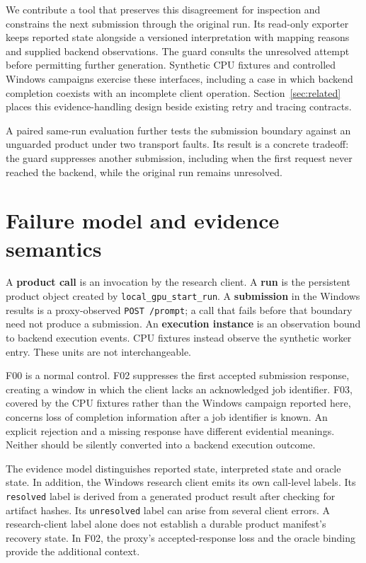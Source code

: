 \documentclass[conference,letterpaper,10pt]{IEEEtran}
\begin{document}
We contribute a tool that preserves this disagreement for inspection and
constrains the next submission through the original run. Its read-only exporter
keeps reported state alongside a versioned interpretation with mapping reasons
and supplied backend observations. The guard consults the unresolved attempt
before permitting further generation. Synthetic CPU fixtures and controlled
Windows campaigns exercise these interfaces, including a case in which backend
completion coexists with an incomplete client operation. Section~\ref{sec:related}
places this evidence-handling design beside existing retry and tracing contracts.

A paired same-run evaluation further tests the submission boundary against an
unguarded product under two transport faults. Its result is a concrete tradeoff:
the guard suppresses another submission, including when the first request never
reached the backend, while the original run remains unresolved.

\section{Failure model and evidence semantics}

A \textbf{product call} is an invocation by the research client. A \textbf{run} is the
persistent product object created by \texttt{local\_gpu\_start\_run}. A \textbf{submission} in
the Windows results is a proxy-observed \texttt{POST /prompt}; a call that fails before
that boundary need not produce a submission. An \textbf{execution instance} is an
observation bound to backend execution events. CPU fixtures instead observe
the synthetic worker entry. These units are not interchangeable.

F00 is a normal control. F02 suppresses the first accepted submission response,
creating a window in which the client lacks an acknowledged job identifier.
F03, covered by the CPU fixtures rather than the Windows campaign reported
here, concerns loss of completion information after a job identifier is known.
An explicit rejection and a missing response have different evidential meanings.
Neither should be silently converted into a backend execution outcome.

The evidence model distinguishes reported state, interpreted state and oracle
state. In addition, the Windows research client emits its own call-level labels.
Its \texttt{resolved} label is derived from a generated product result after checking
for artifact hashes. Its \texttt{unresolved} label can arise from several client errors.
A research-client label alone does not establish a durable product
manifest's recovery state. In F02, the proxy's accepted-response
loss and the oracle binding provide the additional context.
\end{document}
